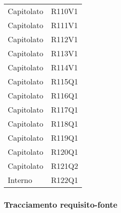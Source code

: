 \documentclass[../analisi-dei-requisiti.tex]{subfiles}
\begin{document}
\begin{longtable}[H]{ p{4cm} | p{4cm} }
  Capitolato                    & R110V1                               \\
  Capitolato                    & R111V1                               \\
  Capitolato                    & R112V1                               \\
  Capitolato                    & R113V1                               \\
  Capitolato                    & R114V1                               \\
  Capitolato                    & R115Q1                               \\
  Capitolato                    & R116Q1                               \\
  Capitolato                    & R117Q1                               \\
  Capitolato                    & R118Q1                               \\
  Capitolato                    & R119Q1                               \\
  Capitolato                    & R120Q1                               \\
  Capitolato                    & R121Q2                               \\
  Interno                       & R122Q1                               \\
\end{longtable}

\newpage
\subsubsection{Tracciamento requisito-fonte}%
\label{subs:tracciamento_requisito-fonte}
\end{document}
